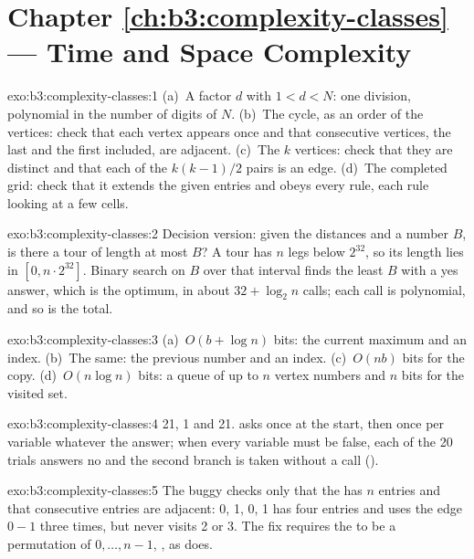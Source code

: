 \section*{Chapter \ref{ch:b3:complexity-classes} --- Time and Space Complexity}

\begin{solution}{exo:b3:complexity-classes:1}
(a)~A factor $d$ with $1 < d < N$: one division, polynomial in the number of digits of $N$. (b)~The cycle, as an order of the vertices: check that each vertex appears once and that consecutive vertices, the last and the first included, are adjacent. (c)~The $k$ vertices: check that they are distinct and that each of the $k(k - 1)/2$ pairs is an edge. (d)~The completed grid: check that it extends the given entries and obeys every rule, each rule looking at a few cells.
\end{solution}

\begin{solution}{exo:b3:complexity-classes:2}
Decision version: given the distances and a number $B$, is there a tour of length at most $B$? A tour has $n$ legs below $2^{32}$, so its length lies in $[0, n \cdot 2^{32}]$. Binary search on $B$ over that interval finds the least $B$ with a yes answer, which is the optimum, in about $32 + \log_2 n$ calls; each call is polynomial, and so is the total.
\end{solution}

\begin{solution}{exo:b3:complexity-classes:3}
(a)~$O(b + \log n)$ bits: the current maximum and an index. (b)~The same: the previous number and an index. (c)~$O(nb)$ bits for the copy. (d)~$O(n \log n)$ bits: a queue of up to $n$ vertex numbers and $n$ bits for the visited set.
\end{solution}

\begin{solution}{exo:b3:complexity-classes:4}
21, 1 and 21.  asks once at the start, then once per variable whatever the answer; when every variable must be false, each of the 20 trials answers no and the second branch is taken without a call ().
\end{solution}

\begin{solution}{exo:b3:complexity-classes:5}
The buggy  checks only that the  has $n$ entries and that consecutive entries are adjacent: 0, 1, 0, 1 has four entries and uses the edge $0 - 1$ three times, but never visits 2 or 3. The fix requires the  to be a permutation of $0, \ldots, n - 1$, , as  does.
\end{solution}

